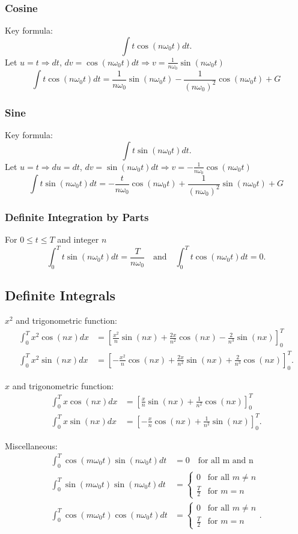 \documentclass{article}
\begin{document}
\subsubsection{Cosine}
Key formula:
\[
    \int t\cos(n\omega _0t)dt.
\]
Let $u=t\Rightarrow dt$, $dv=\cos(n\omega _0t)dt\Rightarrow v=\frac{1}{n\omega _0}\sin(n\omega _0t)$
\[
    \boxed{\int t\cos(n\omega _0t)dt=\frac{1}{n\omega _0}\sin(n\omega _0t)-\frac{1}{\left( n\omega _0 \right)^2}\cos(n\omega _0t)+G}
\]

\subsubsection{Sine}
Key formula:
\[
    \int t\sin(n\omega _0t)dt.
\]
Let $u=t\Rightarrow du=dt$, $dv=\sin(n\omega _0t)dt\Rightarrow v=-\frac{1}{n\omega _0}\cos(n\omega _0t)$
\[
    \boxed{\int t\sin(n\omega _0t)dt=-\frac{t}{n\omega _0}\cos(n\omega _0t)+\frac{1}{\left( n\omega _0 \right)^2}\sin(n\omega _0t)+G}
\]

\subsubsection{Definite Integration by Parts}
For $0\leq t\leq T$ and integer $n$
\[
    \int_0^Tt\sin(n\omega _0t)dt=\boxed{\frac{T}{n\omega _0}}\quad \text{and}\quad \int_0^Tt\cos(n\omega_0t)dt=\boxed{0}.
\]

\subsection{Definite Integrals}
$x^2$ and trigonometric function:
\begin{align*}
    \int_0^T x^2\cos(nx)dx&=\left[ \frac{x^2}{n}\sin(nx)+\frac{2x}{n^2}\cos(nx)-\frac{2}{n^3}\sin(nx) \right]_0^T \\
    \int_0^Tx^2\sin(nx)dx&= \left[ -\frac{x^2}{n}\cos(nx)+\frac{2x}{n^2}\sin(nx)+\frac{2}{n^3}\cos(nx) \right]_0^T.
\end{align*}

$x$ and trigonometric function:
\begin{align*}
    \int_0^Tx\cos(nx)dx &= \left[ \frac{x}{n}\sin(nx)+\frac{1}{n^2}\cos(nx) \right]_0^T \\
    \int_0^Tx\sin(nx)dx&=\left[ -\frac{x}{n}\cos(nx)+\frac{1}{n^2}\sin(nx) \right]_0^T.
\end{align*}

Miscellaneous:
\begin{align*}
    \int_0^T\cos(m\omega _0t)\sin(n\omega _0t)dt&=0\quad \text{for all m and n} \\
    \int_0^T\sin(m\omega _0t)\sin(n\omega _0t)dt&=\begin{cases}
        0 & \text{for all }m\neq n \\
        \frac{T}{2} & \text{for } m=n
    \end{cases} \\
    \int_0^T\cos(m\omega _0t)\cos(n\omega _0t)dt&= \begin{cases}
        0 & \text{for all }m \neq n \\
        \frac{T}{2} & \text{for } m=n
    \end{cases}.
\end{align*}
\end{document}
